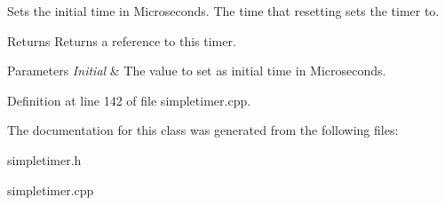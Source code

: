 Sets the initial time in Microseconds. The time that resetting sets the timer to. 

\begin{DoxyReturn}{Returns}
Returns a reference to this timer. 
\end{DoxyReturn}

\begin{DoxyParams}{Parameters}
{\em Initial} & The value to set as initial time in Microseconds. \\
\hline
\end{DoxyParams}


Definition at line 142 of file simpletimer.cpp.



The documentation for this class was generated from the following files:\begin{DoxyCompactItemize}
\item 
simpletimer.h\item 
simpletimer.cpp\end{DoxyCompactItemize}
